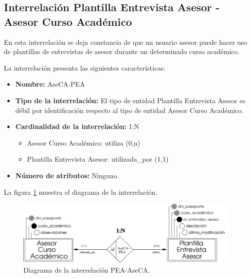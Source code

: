 \subsection{Interrelación Plantilla Entrevista Asesor - Asesor Curso Académico}

   \begin{description}
      \item[Definición] En esta interrelación se deja constancia de que un
      usuario asesor puede hacer uso de plantillas de entrevistas de asesor
      durante un determinado curso académico.

      \item[Características] La interrelación presenta las siguientes
                             características:

         \begin{itemize}
            \item \textbf{Nombre:} AseCA-PEA
            \item \textbf{Tipo de la interrelación:} El tipo de entidad
            Plantilla Entrevista Asesor es débil por identificación respecto al
            tipo de entidad Asesor Curso Académico.
            \item \textbf{Cardinalidad de la interrelación:} 1:N
                  \begin{itemize}
                     \item Asesor Curso Académico: utiliza (0,n)
                     \item Plantilla Entrevista Asesor: utilizada\_por (1,1)
                  \end{itemize}
            \item \textbf{Número de atributos:} Ninguno.
         \end{itemize}

      \item[Diagrama] La figura \ref{diagramaPEA-AseCA} muestra el diagrama de
      la interrelación.

      \item \begin{figure}[!ht]
            \begin{center}
            \includegraphics[]{07.Modelo_Entidad-Interrelacion/7.3.Analisis_Interrelaciones/diagramas/PEA-AseCA.pdf}
            \caption{Diagrama de la interrelación PEA-AseCA.}
            \label{diagramaPEA-AseCA}
            \end{center}
         \end{figure}


\end{description}
